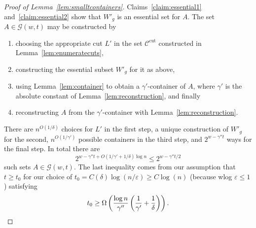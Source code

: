 \documentclass[11pt,letterpaper]{amsart}
\theoremstyle{definition}
\newcommand{\eps}{\varepsilon}
\newcommand*{\Ccut}{\mathcal{C}^{\mathrm{cut}}}
\begin{document}
\begin{proof}[Proof of Lemma~\ref{lem:smalltcontainers}]
Claims~\ref{claim:essential1} and~\ref{claim:essential2} show that $W'_g$ is an essential set for $A$. 
The set $A\in\mathcal{G}(w,t)$ may be constructed by
\begin{enumerate}
\item choosing the appropriate cut $L'$ in the set $\Ccut$ constructed in Lemma~\ref{lem:enumeratecuts},
\item constructing the essential subset $W'_g$ for it as above,
\item using Lemma~\ref{lem:container} to obtain a $\gamma'$-container of $A$, where $\gamma'$ is the absolute constant of Lemma~\ref{lem:reconstruction}, and finally
\item reconstructing $A$ from the $\gamma'$-container with Lemma~\ref{lem:reconstruction}.
\end{enumerate}
There are $n^{O(1/\delta)}$ choices for $L'$ in the first step, a unique construction of $W'_g$ for the second, $n^{O(1/\gamma')}$ possible containers in the third step, and $2^{w - \gamma'' t}$ ways for the final step. In total there are 
\[
2^{w - \gamma'' t +O(1/\gamma' + 1/\delta)\log n} \le 2^{w - \gamma''t/2}
\]
such sets $A\in\mathcal{G}(w,t)$.
The last inequality comes from our assumption that $t \geq t_0$ for our choice of $t_0=C(\delta)\log(n/\eps) \ge C\log(n)$ (because wlog $\eps\le 1$) satisfying 
\[ t_0 \geq \Omega\left(\frac{\log n}{\gamma''}\left(\frac{1}{\gamma'} + \frac{1}{\delta}\right)\right).\qedhere \]
\end{proof}
\end{document}
